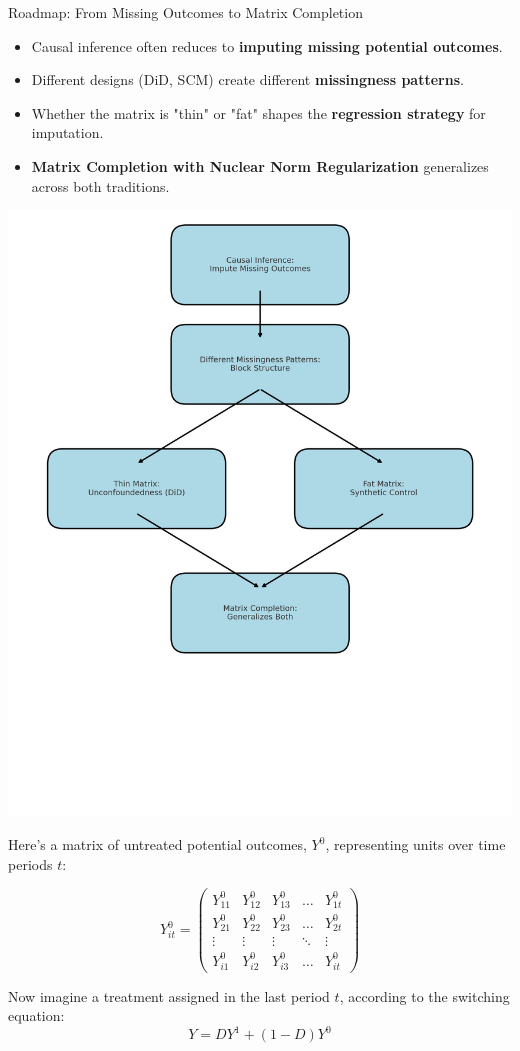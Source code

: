 \documentclass{beamer}
\begin{document}
\begin{frame}{Roadmap: From Missing Outcomes to Matrix Completion}

\begin{itemize}
  \item Causal inference often reduces to \textbf{imputing missing potential outcomes}.
  \item Different designs (DiD, SCM) create different \textbf{missingness patterns}.
  \item Whether the matrix is "thin" or "fat" shapes the \textbf{regression strategy} for imputation.
  \item \textbf{Matrix Completion with Nuclear Norm Regularization} generalizes across both traditions.
\end{itemize}

\begin{center}
\includegraphics[width=0.7\linewidth]{./lecture_includes/flowchart.png}
\end{center}
\end{frame}



\begin{frame}[plain]
\small
Here's a matrix of untreated potential outcomes, $Y^0$, representing units over time periods $t$:
\begin{center}
\[
Y^0_{it} = \begin{pmatrix}
Y^0_{11} & Y^0_{12} & Y^0_{13} & \dots & Y^0_{1t} \\
Y^0_{21} & Y^0_{22} & Y^0_{23} & \dots & Y^0_{2t} \\
\vdots & \vdots & \vdots & \ddots & \vdots \\
Y^0_{i1} & Y^0_{i2} & Y^0_{i3} & \dots & Y^0_{it}
\end{pmatrix}
\]
\end{center}

Now imagine a treatment assigned in the last period $t$, according to the switching equation:
\[
Y = DY^1 + (1-D)Y^0
\]
\end{frame}
\end{document}
